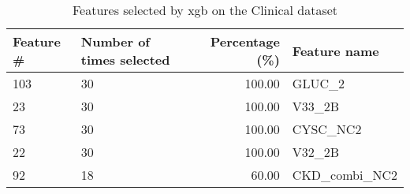 \begin{table}
\caption{Features selected by xgb on the Clinical dataset}
\label{tab:features_xgb_clinical}
\begin{tabular}{llrl}
\toprule
Feature \# & Number of times selected & Percentage (\%) & Feature name \\
\midrule
103 & 30 & 100.00 & GLUC_2 \\
23 & 30 & 100.00 & V33_2B \\
73 & 30 & 100.00 & CYSC_NC2 \\
22 & 30 & 100.00 & V32_2B \\
92 & 18 & 60.00 & CKD_combi_NC2 \\
\bottomrule
\end{tabular}
\end{table}
